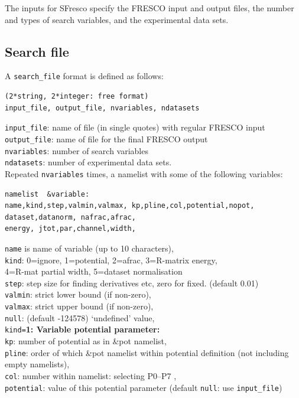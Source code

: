 \documentclass[11pt]{article}
\begin{document}
The inputs for {\sc SFresco} specify the FRESCO input and output files,
the number and types of search variables, and the experimental data sets.

\subsection{Search file}
A {\tt search\_file} format is defined as follows:
\begin{verbatim}
(2*string, 2*integer: free format)
input_file, output_file, nvariables, ndatasets
\end{verbatim}
\smallskip

{\tt input\_file}: name of file (in single quotes) with regular FRESCO input\\
{\tt output\_file}: name of file for the final FRESCO output\\
{\tt nvariables}: number of search variables\\
{\tt ndatasets}:  number of experimental data sets.\\

Repeated {\tt nvariables} times, a namelist with some of the following variables:
\begin{verbatim}
namelist  &variable:
name,kind,step,valmin,valmax, kp,pline,col,potential,nopot,
dataset,datanorm, nafrac,afrac,
energy, jtot,par,channel,width,
\end{verbatim}
{\tt name} is name of variable (up to 10 characters),\\
{\tt kind}: 0=ignore, 1=potential, 2=afrac, 3=R-matrix energy,\\
   \hspace*{10mm} 4=R-mat partial width, 5=dataset normalisation\\
{\tt step}: step size for finding derivatives etc, zero for fixed. (default 0.01)\\
{\tt valmin}: strict lower bound (if non-zero),\\
{\tt valmax}: strict upper bound (if non-zero), \\
{\tt null}: (default -124578) `undefined' value,\\

{\tt kind=}{\bf 1: Variable potential parameter:}\\
{\tt kp}: number of potential as in \&pot namelist,\\
{\tt pline}: order of which \&pot namelist within potential definition (not including empty namelists),\\
{\tt col}:   number within namelist: selecting P0--P7 ,\\
{\tt potential}: value of this potential parameter (default {\tt null}: use {\tt input\_file})\\
\end{document}

